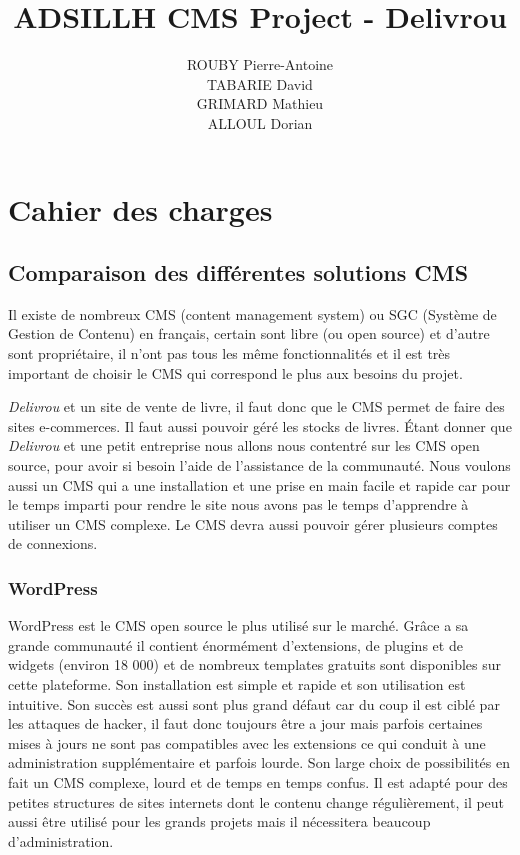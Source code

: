 \documentclass[a4paper,12pt]{report}
\title{ADSILLH CMS Project - Delivrou}
\author{ROUBY Pierre-Antoine \\ TABARIE David \\ GRIMARD Mathieu \\
  ALLOUL Dorian}
\begin{document}
\maketitle
\tableofcontents

\begin{abstract}
\end{abstract}

\part{Cahier des charges}
\chapter{Comparaison des différentes solutions CMS}

Il existe de nombreux CMS (content management system) ou SGC (Système
de Gestion de Contenu) en français, certain sont libre (ou open source)
et d'autre sont propriétaire, il n'ont pas tous les même fonctionnalités
et il est très important de choisir le CMS qui correspond le plus aux
besoins du projet.

\textit{Delivrou} et un site de vente de livre, il faut donc que le CMS
permet de faire des sites e-commerces. Il faut aussi pouvoir géré les
stocks de livres. Étant donner que \textit{Delivrou} et une petit
entreprise nous allons nous contentré sur les CMS open source, pour
avoir si besoin l'aide de l'assistance de la communauté. Nous voulons
aussi un CMS qui a une installation et une prise en main facile et rapide
car pour le temps imparti pour rendre le site nous avons pas le temps d'apprendre
à utiliser un CMS complexe. Le CMS devra aussi pouvoir gérer plusieurs
comptes de connexions.

\section{WordPress}

WordPress est le CMS open source le plus utilisé sur le marché. Grâce
a sa grande communauté il contient énormément d’extensions, de plugins
et de widgets (environ 18 000) et de nombreux templates gratuits sont
disponibles sur cette plateforme. Son installation est simple et
rapide et son utilisation est intuitive.  Son succès est aussi sont
plus grand défaut car du coup il est ciblé par les attaques de hacker,
il faut donc toujours être a jour mais parfois certaines mises à jours
ne sont pas compatibles avec les extensions ce qui conduit à une
administration supplémentaire et parfois lourde. Son large choix de
possibilités en fait un CMS complexe, lourd et de temps en temps
confus.  Il est adapté pour des petites structures de sites internets
dont le contenu change régulièrement, il peut aussi être utilisé pour
les grands projets mais il nécessitera beaucoup d'administration.
\end{document}
